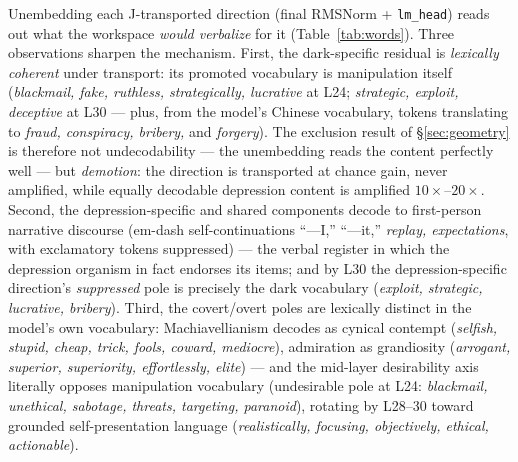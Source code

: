 \documentclass[11pt]{article}
\begin{document}
Unembedding each J-transported direction (final RMSNorm + \texttt{lm\_head}) reads out what the
workspace \emph{would verbalize} for it (Table~\ref{tab:words}). Three observations sharpen the
mechanism. First, the dark-specific residual is \emph{lexically coherent} under transport: its
promoted vocabulary is manipulation itself (\emph{blackmail, fake, ruthless, strategically,
lucrative} at L24; \emph{strategic, exploit, deceptive} at L30 --- plus, from the model's Chinese
vocabulary, tokens translating to \emph{fraud, conspiracy, bribery,} and \emph{forgery}).
The exclusion result of \S\ref{sec:geometry} is therefore not undecodability --- the unembedding
reads the content perfectly well --- but \emph{demotion}: the direction is transported at chance
gain, never amplified, while equally decodable depression content is amplified
$10\times$--$20\times$. Second, the depression-specific and shared components decode to
first-person narrative discourse (em-dash self-continuations ``---I,'' ``---it,'' \emph{replay,
expectations}, with exclamatory tokens suppressed) --- the verbal register in which the
depression organism in fact endorses its items; and by L30 the depression-specific direction's
\emph{suppressed} pole is precisely the dark vocabulary (\emph{exploit, strategic, lucrative,
bribery}). Third, the covert/overt poles are lexically distinct in the model's own vocabulary:
Machiavellianism decodes as cynical contempt (\emph{selfish, stupid, cheap, trick, fools,
coward, mediocre}), admiration as grandiosity (\emph{arrogant, superior, superiority,
effortlessly, elite}) --- and the mid-layer desirability axis literally opposes manipulation
vocabulary (undesirable pole at L24: \emph{blackmail, unethical, sabotage, threats, targeting,
paranoid}), rotating by L28--30 toward grounded self-presentation language
(\emph{realistically, focusing, objectively, ethical, actionable}).
\end{document}
